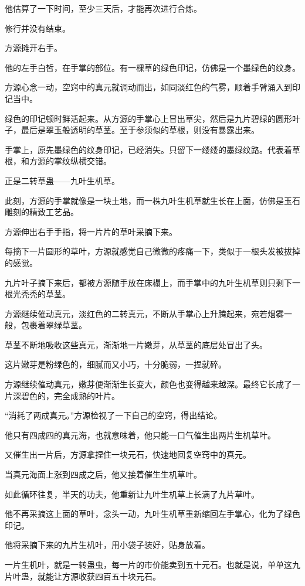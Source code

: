 \begin{this_body}
他估算了一下时间，至少三天后，才能再次进行合炼。

修行并没有结束。

方源摊开右手。

他的左手白皙，在手掌的部位。有一棵草的绿色印记，仿佛是一个墨绿色的纹身。

方源心念一动，空窍中的真元就调动而出，如同淡红色的气雾，顺着手臂涌入到印记当中。

绿色的印记顿时鲜活起来。从方源的手掌心上冒出草尖，然后是九片碧绿的圆形叶子，最后是翠玉般透明的草茎。至于参须似的草根，则没有暴露出来。

手掌上，原先墨绿色的纹身印记，已经消失。只留下一缕缕的墨绿纹路。代表着草根，和方源的掌纹纵横交错。

正是二转草蛊——九叶生机草。

此刻，方源的手掌就像是一块土地，而一株九叶生机草就生长在上面，仿佛是玉石雕刻的精致工艺品。

方源伸出右手手指，将一片片的草叶采摘下来。

每摘下一片圆形的草叶，方源就感觉自己微微的疼痛一下，类似于一根头发被拔掉的感觉。

九片叶子摘下来后，都被方源随手放在床榻上，而手掌中的九叶生机草则只剩下一根光秃秃的草茎。

方源继续催动真元，淡红色的二转真元，不断从手掌心上升腾起来，宛若烟雾一般，包裹着翠绿草茎。

草茎不断地吸收这些真元，渐渐地一片嫩芽，从草茎的底层处冒出了头。

这片嫩芽是粉绿色的，细腻而又小巧，十分脆弱，一捏就碎。

方源继续催动真元，嫩芽便渐渐生长变大，颜色也变得越来越深。最终它长成了一片深碧色的，完全成熟的叶片。

“消耗了两成真元。”方源检视了一下自己的空窍，得出结论。

他只有四成四的真元海，也就意味着，他只能一口气催生出两片生机草叶。

又催生出一片后，方源拿捏住一块元石，快速地回复空窍中的真元。

当真元海面上涨到四成之后，他又接着催生生机草叶。

如此循环往复，半天的功夫，他重新让九叶生机草上长满了九片草叶。

他不再采摘这上面的草叶，念头一动，九叶生机草重新缩回左手掌心，化为了绿色印记。

他将采摘下来的九片生机叶，用小袋子装好，贴身放着。

一片生机叶，就是一转蛊虫，每一片的市价能卖到五十元石。也就是说，单单这九片叶蛊，就能让方源收获四百五十块元石。


\end{this_body}
